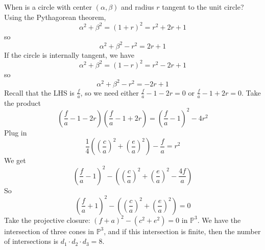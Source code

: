\documentclass{report}
\begin{document}
When is a circle with center $(\alpha, \beta)$ and radius $r$ tangent to the unit circle? Using the Pythagorean theorem,
    \begin{equation*}
        \alpha^{ 2} + \beta^{ 2} = (1 + r)^{2} = r^{2} + 2r + 1
    \end{equation*}
so
    \begin{equation*}
        \alpha^{ 2} + \beta^{ 2} - r^{2} = 2r + 1
    \end{equation*}
If the circle is internally tangent, we have
    \begin{equation*}
        \alpha^{ 2} + \beta^{ 2} = (1 - r)^{2} = r^{2} - 2r + 1
    \end{equation*}
so
    \begin{equation*}
        \alpha^{ 2} + \beta^{ 2} - r^{2} = -2r + 1
    \end{equation*}
Recall that the LHS is $\frac{f}{a}$, so we need either $\frac{f}{a} - 1 - 2r = 0$ or $\frac{f}{a} - 1 + 2r = 0$. Take the product
    \begin{equation*}
        (\dfrac{f}{a} - 1 - 2r)(\dfrac{f}{a} - 1 + 2r) = \left(\dfrac{f}{a} - 1\right)^{2} - 4r^{2}
    \end{equation*}
Plug in 
    \begin{equation*}
        \dfrac{1}{4}\left(\left(\dfrac{c}{a}\right)^{2} + \left(\dfrac{e}{a}\right)^{2}\right)  - \dfrac{f}{a} = r^{2}
    \end{equation*}
We get
    \begin{equation*}
        \left(\dfrac{f}{a} - 1\right)^{2} - \left(\left(\dfrac{c}{a}\right)^{2} + \left(\dfrac{e}{a}\right)^{2} - \dfrac{4f}{a}\right) 
    \end{equation*}
So
    \begin{equation*}
        \left(\dfrac{f}{a} + 1\right)^{2} - \left(\left(\dfrac{c}{a}\right)^{2} + \left(\dfrac{e}{a}\right)^{2}\right) = 0
    \end{equation*}
Take the projective closure: $(f + a)^{2} - (c^{2} + e^{2}) = 0$ in $\mathbb{P}^{3}$. We have the intersection of three cones in $\mathbb{P}^{3}$, and if this intersection is finite, then the number of intersections is $d_{1} \cdot d_{ 2}\cdot d_{ 3} = 8$.
\end{document}

